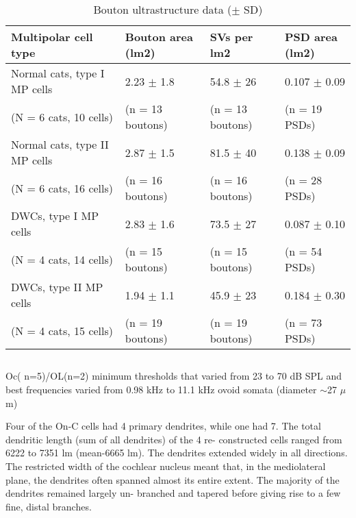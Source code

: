 \documentclass[10pt,a4paper]{article}
\begin{document}
\begin{table}[h]
\caption{Bouton ultrastructure data ($\pm$ SD) \citep[Table 2 in ][]{ReddCahillEtAl:2002}}
\begin{tabularx}{\textwidth}{XXXX} \toprule
Multipolar cell type           &  Bouton area (lm2)         &    SVs per lm2                   &     PSD area (lm2)            \\ \midrule
Normal cats, type I MP cells   &  2.23  $\pm$     1.8       &    54.8  $\pm$   26              &     0.107  $\pm$     0.09     \\
(N = 6 cats, 10 cells)         &  (n    =     13 boutons)   &    (n     =       13  boutons)   &     (n      =        19 PSDs) \\
Normal cats, type II MP cells  &  2.87  $\pm$     1.5       &    81.5  $\pm$   40              &     0.138  $\pm$     0.09     \\
(N = 6 cats, 16 cells)         &  (n    =     16 boutons)   &    (n     =       16  boutons)   &     (n      =        28 PSDs) \\        
DWCs, type I MP cells          &  2.83  $\pm$     1.6       &    73.5  $\pm$   27              &     0.087  $\pm$     0.10     \\
(N = 4 cats, 14 cells)         &  (n    =     15 boutons)   &    (n     =       15  boutons)   &     (n      =        54 PSDs) \\        
DWCs, type II MP cells         &  1.94  $\pm$     1.1       &    45.9  $\pm$   23              &     0.184  $\pm$     0.30     \\           
(N = 4 cats, 15 cells)         &  (n   =      19 boutons)   &    (n     =       19 boutons)    &     (n      =        73 PSDs) \\
\bottomrule  
\end{tabularx}
\end{table}




\subsection{\citep{ArnottWallaceEtAl:2003}}
Oc( n=5)/OL(n=2) minimum thresholds that varied from 23 to 70 dB SPL and best frequencies varied from 0.98 kHz to 11.1 kHz
ovoid somata (diameter $\sim$27 $\mu$m) 

Four of the On-C cells had 4 primary dendrites, while one had 7. The total
dendritic length (sum of all dendrites) of the 4 re- constructed cells ranged
from 6222 to 7351 lm (mean-6665 lm). The dendrites extended widely in all
directions. The restricted width of the cochlear nucleus meant that, in the
mediolateral plane, the dendrites often spanned almost its entire extent. The
majority of the dendrites remained largely un- branched and tapered before
giving rise to a few fine, distal branches.
\end{document}
